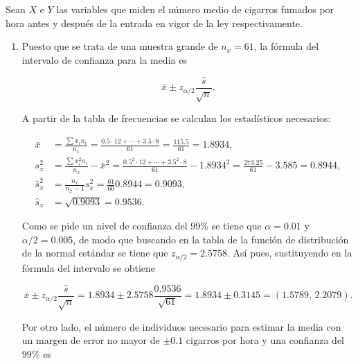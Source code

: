\documentclass[
  spanish,
  a4paper,
]{scrreport}
\theoremstyle{definition}
\theoremstyle{remark}
\begin{document}
\begin{tcolorbox}[enhanced jigsaw, arc=.35mm, bottomrule=.15mm, bottomtitle=1mm, breakable, colback=white, colbacktitle=quarto-callout-tip-color!10!white, colframe=quarto-callout-tip-color-frame, coltitle=black, left=2mm, leftrule=.75mm, opacityback=0, opacitybacktitle=0.6, rightrule=.15mm, title=\textcolor{quarto-callout-tip-color}{\faLightbulb}\hspace{0.5em}{Solución}, titlerule=0mm, toprule=.15mm, toptitle=1mm]

Sean \(X\) e \(Y\) las variables que miden el número medio de cigarros
fumados por hora antes y después de la entrada en vigor de la ley
respectivamente.

\begin{enumerate}
\def\labelenumi{\alph{enumi}.}
\item
  Puesto que se trata de una muestra grande de \(n_x=61\), la fórmula
  del intervalo de confianza para la media es

  \[
  \bar x \pm z_{\alpha/2}\frac{\hat s}{\sqrt n}.
  \]

  A partir de la tabla de frecuencias se calculan los estadísticos
  necesarios:

  \begin{align*}
  \bar x &= \frac{\sum x_in_i}{n_x} = \frac{0.5\cdot12+\cdots+3.5\cdot8}{61} = \frac{115.5}{61} = 1.8934,\\
  s_x^2 & = \frac{\sum x_i^2n_i}{n_x}-\bar x^2 = \frac{0.5^2\cdot12+\cdots+3.5^2\cdot8}{61} -1.8934^2= \frac{273.25}{61}-3.585 = 0.8944,\\
  \hat s_x^2 &= \frac{n_x}{n_x-1}s_x^2 = \frac{61}{60}0.8944 = 0.9093,\\
  \hat s_x & = \sqrt{0.9093} = 0.9536.
  \end{align*}

  Como se pide un nivel de confianza del \(99\%\) se tiene que
  \(\alpha=0.01\) y \(\alpha/2=0.005\), de modo que buscando en la tabla
  de la función de distribución de la normal estándar se tiene que
  \(z_{\alpha/2} =2.5758\). Así pues, sustituyendo en la fórmula del
  intervalo se obtiene

  \[
  \bar x \pm z_{\alpha/2}\frac{\hat s}{\sqrt n} = 1.8934 \pm 2.5758\frac{0.9536}{\sqrt{61}} = 1.8934\pm 0.3145 = (1.5789,\,2.2079).
  \]

  Por otro lado, el número de individuos necesario para estimar la media
  con un margen de error no mayor de \(\pm 0.1\) cigarros por hora y una
  confianza del \(99\%\) es


\end{enumerate}
\end{tcolorbox}
\end{document}
